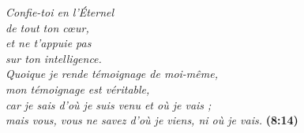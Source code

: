 \newpage
\mbox{}
\vfill


\begin{myverse}
{\itshape
Confie-toi en l'Éternel\\
 de tout ton cœur,\\
et ne t'appuie pas\\ sur ton intelligence.\\[5mm]
\Og{}Quoique je rende témoignage de moi-même, \\
 mon témoignage est véritable, \\
 car je sais d’où je suis venu et où je vais ; \\
 mais vous, vous ne savez d’où je viens, ni où je vais.\Fg{}
}
\myversereffont\bfseries\scshape {}(8:14)
\end{myverse}
\vfill
\mbox{}
\newpage
